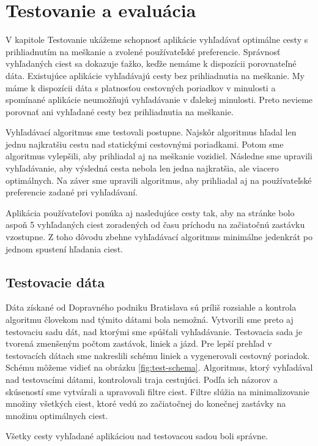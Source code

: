  \chapter{Testovanie a evaluácia}
\label{kap:tes}

V kapitole Testovanie ukážeme schopnosť aplikácie vyhľadávať optimálne cesty s prihliadnutím na meškanie a zvolené používateľské preferencie. Správnosť vyhľadaných ciest sa dokazuje ťažko, keďže nemáme k dispozícii porovnateľné dáta. Existujúce aplikácie vyhľadávajú cesty bez prihliadnutia na meškanie. My máme k dispozícii dáta s platnosťou cestovných poriadkov v minulosti a spomínané aplikácie neumožňujú vyhľadávanie v ďalekej minulosti. Preto nevieme porovnať ani vyhľadané cesty bez prihliadnutia na meškanie.

Vyhľadávací algoritmus sme testovali postupne. Najskôr algoritmus hľadal len jednu najkratšiu cestu nad statickými cestovnými poriadkami. Potom sme algoritmus vylepšili, aby prihliadal aj na meškanie vozidiel. Následne sme upravili vyhľadávanie, aby výsledná cesta nebola len jedna najkratšia, ale viacero optimálnych. Na záver sme upravili algoritmus, aby prihliadal aj na používateľské preferencie zadané pri vyhľadávaní. 

Aplikácia používateľovi ponúka aj nasledujúce cesty tak, aby na stránke bolo aspoň 5 vyhľadaných ciest zoradených od času príchodu na začiatočnú zastávku vzostupne. Z toho dôvodu zbehne vyhľadávací algoritmus minimálne jedenkrát po jednom spustení hľadania ciest.


\section{Testovacie dáta}

Dáta získané od Dopravného podniku Bratislava sú príliš rozsiahle a kontrola algoritmu človekom nad týmito dátami bola nemožná. Vytvorili sme preto aj testovaciu sadu dát, nad ktorými sme spúšťali vyhľadávanie. Testovacia sada je tvorená zmenšeným počtom zastávok, liniek a jázd. Pre lepší prehľad v testovacích dátach sme nakreslili schému liniek a vygenerovali cestovný poriadok. Schému môžeme vidieť na obrázku \ref{fig:test-schema}. Algoritmus, ktorý vyhľadával nad testovacími dátami, kontrolovali traja cestujúci. Podľa ich názorov a skúseností sme vytvárali a upravovali filtre ciest. Filtre slúžia na minimalizovanie množiny všetkých ciest, ktoré vedú zo začiatočnej do konečnej zastávky na množinu optimálnych ciest. 

Všetky cesty vyhľadané aplikáciou nad testovacou sadou boli správne.

